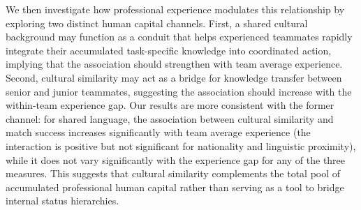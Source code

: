 \documentclass[10pt]{article}
\begin{document}



We then investigate how professional experience modulates this relationship by exploring two distinct human capital channels. First, a shared cultural background may function as a conduit that helps experienced teammates rapidly integrate their accumulated task-specific knowledge into coordinated action, implying that the association should strengthen with team average experience. Second, cultural similarity may act as a bridge for knowledge transfer between senior and junior teammates, suggesting the association should increase with the within-team experience gap. Our results are more consistent with the former channel: for shared language, the association between cultural similarity and match success increases significantly with team average experience (the interaction is positive but not significant for nationality and linguistic proximity), while it does not vary significantly with the experience gap for any of the three measures. This suggests that cultural similarity complements the total pool of accumulated professional human capital rather than serving as a tool to bridge internal status hierarchies.
\end{document}

